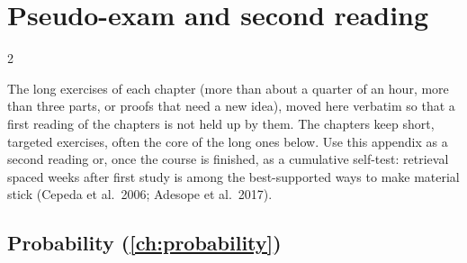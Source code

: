 \chapter{Pseudo-exam and second reading}\label{app:exam}
\begin{paracol}{2}

The long exercises of each chapter (more than about a quarter of an hour, more than three parts, or proofs that
need a new idea), moved here verbatim so that a first reading of the chapters is not held up by them. The
chapters keep short, targeted exercises, often the core of the long ones below. Use this appendix as a second
reading or, once the course is finished, as a cumulative self-test: retrieval spaced weeks after first study is
among the best-supported ways to make material stick (Cepeda et al.\ 2006; Adesope et al.\ 2017).

\section{Probability (\cref{ch:probability})}\label{exam:ch03}


\end{paracol}
